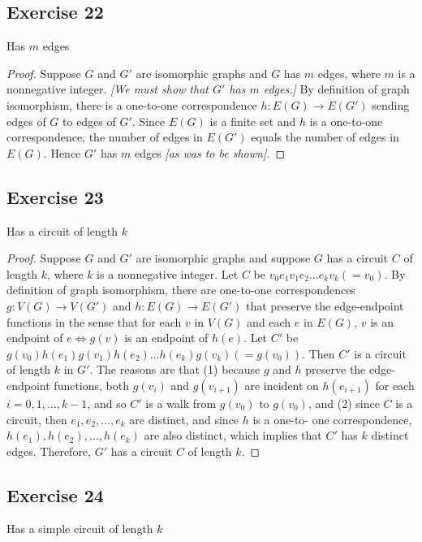 \documentclass[14pt]{extarticle}
\begin{document}
\subsection{Exercise 22}
Has \(m\) edges

\begin{proof}
    Suppose \(G\) and \(G'\) are isomorphic graphs and \(G\) has \(m\) edges, where \(m\) is a nonnegative integer. {\it [We
                must show that \(G'\) has \(m\) edges.]} By definition of graph isomorphism, there is a one-to-one correspondence \(h:
    E(G) \to E(G')\) sending edges of \(G\) to edges of \(G'\). Since \(E(G)\) is a finite set and \(h\) is a one-to-one
    correspondence, the number of edges in \(E(G')\) equals the number of edges in \(E(G)\). Hence \(G'\) has \(m\) edges
        {\it [as was to be shown].}
\end{proof}

\subsection{Exercise 23}
Has a circuit of length \(k\)

\begin{proof}
    Suppose \(G\) and \(G'\) are isomorphic graphs and suppose \(G\) has a circuit \(C\) of length \(k\), where \(k\) is a
    nonnegative integer. Let \(C\) be \(v_0e_1v_1e_2 \ldots e_kv_k(=v_0)\). By definition of graph isomorphism, there are
    one-to-one correspondences \(g: V(G) \to V(G')\) and \(h: E(G) \to E(G')\) that preserve the edge-endpoint functions in the
    sense that for each \(v\) in \(V(G)\) and each \(e\) in \(E(G)\), \(v\) is an endpoint of \(e \iff g(v)\) is an endpoint of
    \(h(e)\). Let \(C'\) be \(g(v_0)h(e_1)g(v_1)h(e_2) \ldots h(e_k)g(v_k)(=g(v_0))\). Then \(C'\) is a circuit of length
    \(k\) in \(G'\). The reasons are that (1) because \(g\) and \(h\) preserve the edge-endpoint functions, both \(g(v_i)\) and
    \(g(v_{i + 1})\) are incident on \(h(e_{i + 1})\) for each \(i = 0, 1, \ldots, k-1\), and so \(C'\) is a walk from \(g(v_0)\)
    to \(g(v_0)\), and (2) since \(C\) is a circuit, then \(e_1, e_2, \ldots, e_k\) are distinct, and since \(h\) is a one-to-
    one correspondence, \(h(e_1), h(e_2), \ldots, h(e_k)\) are also distinct, which implies that \(C'\) has \(k\) distinct
    edges. Therefore, \(G'\) has a circuit \(C\) of length \(k\).
\end{proof}

\subsection{Exercise 24}
Has a simple circuit of length \(k\)
\end{document}
